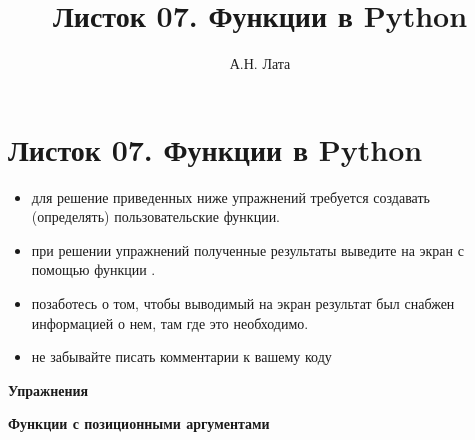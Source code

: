 \documentclass[a4,12pt]{article}
\title{Листок 07. Функции в Python}
\author{А.Н. Лата}
\theoremstyle{remark}
\begin{document}
 


\section*{\centering Листок 07. Функции в Python}

\begin{exercisenote}[title=Замечания]
\begin{itemize}
    \item для решение приведенных ниже упражнений требуется создавать (определять) пользовательские функции.
    \item при решении упражнений полученные результаты выведите на экран с помощью функции {\color{blue}{print()}}.
    \item позаботесь о том, чтобы выводимый на экран результат был снабжен информацией о нем, там где это необходимо.
    \item не забывайте писать комментарии к вашему коду
\end{itemize}
\end{exercisenote}

\textbf{Упражнения}

\textbf{Функции с позиционными аргументами}
\end{document}
